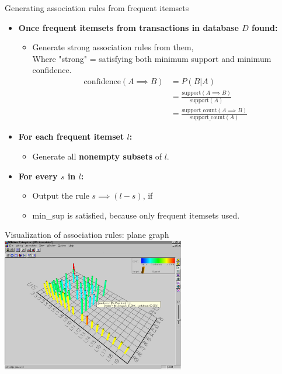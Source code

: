 \documentclass[aspectratio=169,t,xcolor=dvipsnames]{beamer}
\begin{document}
  {
    \begin{frame}{Generating association rules from frequent itemsets}
        \begin{itemize}
            \item \textbf{Once frequent itemsets from transactions in database $D$ found:}
            \begin{itemize}
              \item Generate strong association rules from them,\\
                    Where "strong" = satisfying both minimum support and minimum confidence.
                    \begin{align}
                      \text{confidence}(A \implies B) &= P(B|A)\\
                      &= \frac{\text{support}(A \implies B)}{\text{support}(A)}\\
                      &= \frac{\text{support\_count}(A \implies B)}{\text{support\_count}(A)}
                    \end{align}
            \end{itemize}
            \item \textbf{For each frequent itemset $l$:}
            \begin{itemize}
              \item Generate all \textbf{nonempty subsets} of $l$.
            \end{itemize}
            \item \textbf{For every $s$ in $l$:}
            \begin{itemize}
              \item Output the rule $s \implies (l - s)$, if
              \item min\_sup is satisfied, because only frequent itemsets used.
            \end{itemize}
        \end{itemize}
    \end{frame}
  }

  {
    \begin{frame}{Visualization of association rules: plane graph}
    \includegraphics[width=0.6\textwidth]{img/assoc_rules1.jpg}
    \end{frame}
  }
\end{document}
